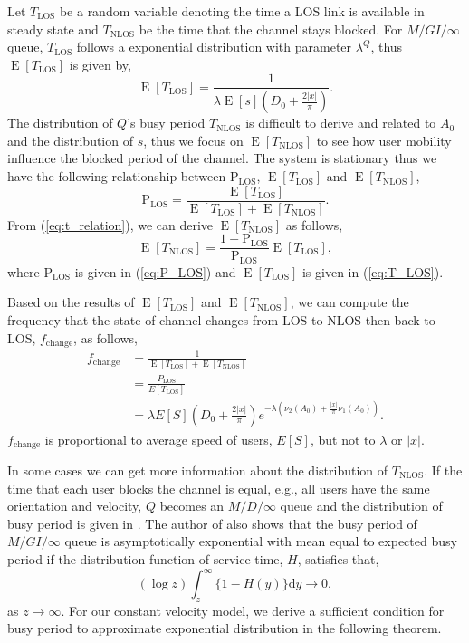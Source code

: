 \documentclass[10pt, conference, letterpaper]{IEEEtran}
\DeclareMathOperator*{\E}{\mathrm{E}}
\DeclareMathOperator*{\LOS}{\mathrm{LOS}}
\DeclareMathOperator*{\NLOS}{\mathrm{NLOS}}
\begin{document}
Let $T_{\mathrm{LOS}}$ be a random variable denoting the time a LOS link is available in steady state and $T_{\mathrm{NLOS}}$ be the time that the channel stays blocked. For $M/GI/\infty$ queue, $T_{\mathrm{LOS}}$ follows a exponential distribution with parameter $\lambda^Q$, thus $\E[T_{\mathrm{LOS}}]$ is given by, 
\begin{equation}\label{eq:T_LOS}
\E[T_{\mathrm{LOS}}] = \frac{1}{\lambda\E[s](D_0 + \frac{2|x|}{\pi})}.
\end{equation}
The distribution of $Q$'s busy period $T_{\NLOS}$ is difficult to derive and related to $A_0$ and the distribution of $s$, thus we focus on $\E[T_{\mathrm{NLOS}}]$ to see how user mobility influence the blocked period of the channel. The system is stationary thus we have the following relationship between $\mathrm{P}_{\LOS}$, $\E[T_{\LOS}]$ and $\E[T_{\NLOS}]$, 
\begin{equation}\label{eq:t_relation}
\mathrm{P}_{\LOS} = \frac{\E[T_{\LOS}]}{\E[T_{\LOS}] + \E[T_{\NLOS}]}.
\end{equation}
From (\ref{eq:t_relation}), we can derive $\E[T_{\NLOS}]$ as follows, 
\begin{equation*}\label{eq:T_NLOS}
\E[T_{\NLOS}] = \frac{1-\mathrm{P}_{\LOS}}{\mathrm{P}_{\LOS}}\E[T_{\LOS}],
\end{equation*}
where $\mathrm{P}_{\LOS}$ is given in (\ref{eq:P_LOS}) and $\E[T_{\LOS}]$ is given in (\ref{eq:T_LOS}).

Based on the results of $\E[T_{\LOS}]$ and $\E[T_{\NLOS}]$, we can compute the frequency that the state of channel changes from LOS to NLOS then back to LOS, $f_{\mathrm{change}}$, as follows,
\begin{align}
f_{\mathrm{change}} & = \frac{1}{\E[T_{\LOS}] + \E[T_{\NLOS}]} \nonumber \\
 & = \frac{P_{\LOS}}{E[T_{\LOS}]} \nonumber \\
 & = \lambda E[S] (D_0 + \frac{2|x|}{\pi}) e^{-\lambda(\nu_2(A_0) + \frac{|x|}{\pi}\nu_1(A_0))}. \label{eq:frequency}
\end{align}
$f_{\mathrm{change}}$ is proportional to average speed of users, $E[S]$, but not to $\lambda$ or $|x|$.

In some cases we can get more information about the distribution of $T_{\NLOS}$. If the time that each user blocks the channel is equal, e.g., all users have the same orientation and velocity, $Q$ becomes an $M/D/\infty$ queue and the distribution of busy period is given in \cite{busyperiod_heavytraffic}. The author of \cite{busyperiod_heavytraffic} also shows that the busy period of $M/GI/\infty$ queue is asymptotically exponential with mean equal to expected busy period if the distribution function of service time, $H$, satisfies that,  
\begin{equation}\label{eq:busyperiod_condition}
(\log z) \int_{z}^{\infty}\{1-H(y)\}\mathrm{d}y\rightarrow 0,
\end{equation}
as $z\rightarrow \infty$. 
For our constant velocity model, we derive a sufficient condition for busy period to approximate exponential distribution in the following theorem.
\end{document}
